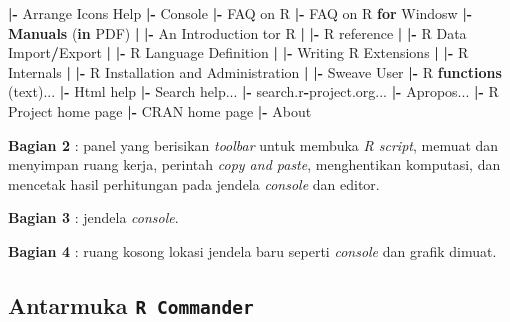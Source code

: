 \documentclass[12pt,]{krantz}
\newenvironment{Shaded}{\begin{snugshade}}{\end{snugshade}}
\newcommand{\ControlFlowTok}[1]{\textcolor[rgb]{0.13,0.29,0.53}{\textbf{#1}}}
\newcommand{\ErrorTok}[1]{\textcolor[rgb]{0.64,0.00,0.00}{\textbf{#1}}}
\newcommand{\KeywordTok}[1]{\textcolor[rgb]{0.13,0.29,0.53}{\textbf{#1}}}
\newcommand{\NormalTok}[1]{#1}
\newcommand{\OperatorTok}[1]{\textcolor[rgb]{0.81,0.36,0.00}{\textbf{#1}}}
\newcommand{\StringTok}[1]{\textcolor[rgb]{0.31,0.60,0.02}{#1}}
\begin{document}
\begin{Shaded}
\begin{Highlighting}[]
  \OperatorTok{|-}\StringTok{ }\NormalTok{Arrange Icons}
\NormalTok{Help}
  \OperatorTok{|-}\StringTok{ }\NormalTok{Console}
  \OperatorTok{|-}\StringTok{ }\NormalTok{FAQ on R}
  \OperatorTok{|-}\StringTok{ }\NormalTok{FAQ on R }\ControlFlowTok{for}\NormalTok{ Windosw}
  \OperatorTok{|-}\StringTok{ }\KeywordTok{Manuals}\NormalTok{ (}\ControlFlowTok{in}\NormalTok{ PDF)}
  \OperatorTok{|}\StringTok{ }\ErrorTok{|}\OperatorTok{-}\StringTok{ }\NormalTok{An Introduction tor R}
  \OperatorTok{|}\StringTok{ }\ErrorTok{|}\OperatorTok{-}\StringTok{ }\NormalTok{R reference}
  \OperatorTok{|}\StringTok{ }\ErrorTok{|}\OperatorTok{-}\StringTok{ }\NormalTok{R Data Import}\OperatorTok{/}\NormalTok{Export}
  \OperatorTok{|}\StringTok{ }\ErrorTok{|}\OperatorTok{-}\StringTok{ }\NormalTok{R Language Definition}
  \OperatorTok{|}\StringTok{ }\ErrorTok{|}\OperatorTok{-}\StringTok{ }\NormalTok{Writing R Extensions}
  \OperatorTok{|}\StringTok{ }\ErrorTok{|}\OperatorTok{-}\StringTok{ }\NormalTok{R Internals}
  \OperatorTok{|}\StringTok{ }\ErrorTok{|}\OperatorTok{-}\StringTok{ }\NormalTok{R Installation and Administration}
  \OperatorTok{|}\StringTok{ }\ErrorTok{|}\OperatorTok{-}\StringTok{ }\NormalTok{Sweave User}
  \OperatorTok{|-}\StringTok{ }\NormalTok{R }\KeywordTok{functions}\NormalTok{ (text)...}
  \OperatorTok{|-}\StringTok{ }\NormalTok{Html help}
  \OperatorTok{|-}\StringTok{ }\NormalTok{Search help...}
  \OperatorTok{|-}\StringTok{ }\NormalTok{search.r}\OperatorTok{-}\NormalTok{project.org...}
  \OperatorTok{|-}\StringTok{ }\NormalTok{Apropos...}
  \OperatorTok{|-}\StringTok{ }\NormalTok{R Project home page}
  \OperatorTok{|-}\StringTok{ }\NormalTok{CRAN home page}
  \OperatorTok{|-}\StringTok{ }\NormalTok{About}
\end{Highlighting}
\end{Shaded}

\textbf{Bagian 2} : panel yang berisikan \emph{toolbar} untuk membuka \emph{R script}, memuat dan menyimpan ruang kerja, perintah \emph{copy and paste}, menghentikan komputasi, dan mencetak hasil perhitungan pada jendela \emph{console} dan editor.

\textbf{Bagian 3} : jendela \emph{console}.

\textbf{Bagian 4} : ruang kosong lokasi jendela baru seperti \emph{console} dan grafik dimuat.

\hypertarget{antarmuka-r-commander}{%
\subsection{\texorpdfstring{Antarmuka \texttt{R\ Commander}}{Antarmuka R Commander}}\label{antarmuka-r-commander}}
\end{document}
